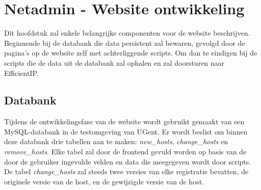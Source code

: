
\chapter{Netadmin - Website ontwikkeling}%
\label{ch:netadmin-website-ontwikkeling}
Dit hoofdstuk zal enkele belangrijke componenten voor de website beschrijven. Beginnende bij de databank die data persistent zal bewaren, gevolgd door de pagina's op de website zelf met achterliggende scripts. Om dan te eindigen bij de scripts die de data uit de databank zal ophalen en zal doorsturen naar EfficientIP.

\section{Databank}
\label{databank}
Tijdens de ontwikkelingsfase van de website wordt gebruikt gemaakt van een MySQL-databank in de testomgeving van UGent. Er wordt beslist om binnen deze databank drie tabellen aan te maken: \textit{new\_hosts}, \textit{change\_hosts} en \textit{remove\_hosts}. Elke tabel zal door de frontend gevuld worden op basis van de door de gebruiker ingevulde velden en data die meegegeven wordt door scripts. 
De tabel \textit{change\_hosts} zal steeds twee versies van elke registratie bevatten, de originele versie van de host, en de gewijzigde versie van de host.

